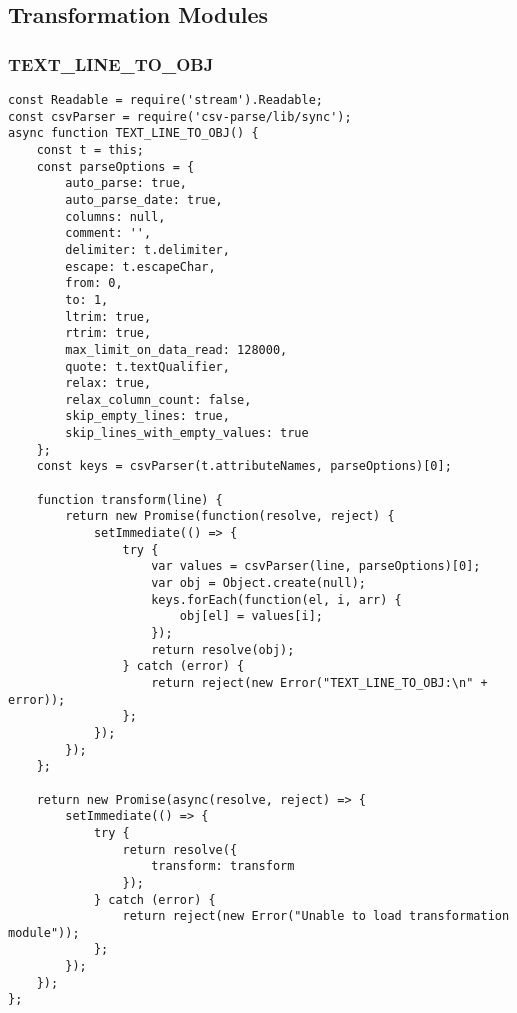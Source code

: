 \subsection{Transformation Modules}
\subsubsection{TEXT\_LINE\_TO\_OBJ}
\label{netl-trans-text-line-to-obj}
\begin{verbatim}
const Readable = require('stream').Readable;
const csvParser = require('csv-parse/lib/sync');
async function TEXT_LINE_TO_OBJ() {
    const t = this;
    const parseOptions = {
        auto_parse: true,
        auto_parse_date: true,
        columns: null,
        comment: '',
        delimiter: t.delimiter,
        escape: t.escapeChar,
        from: 0,
        to: 1,
        ltrim: true,
        rtrim: true,
        max_limit_on_data_read: 128000,
        quote: t.textQualifier,
        relax: true,
        relax_column_count: false,
        skip_empty_lines: true,
        skip_lines_with_empty_values: true
    };
    const keys = csvParser(t.attributeNames, parseOptions)[0];

    function transform(line) {
        return new Promise(function(resolve, reject) {
            setImmediate(() => {
                try {
                    var values = csvParser(line, parseOptions)[0];
                    var obj = Object.create(null);
                    keys.forEach(function(el, i, arr) {
                        obj[el] = values[i];
                    });
                    return resolve(obj);
                } catch (error) {
                    return reject(new Error("TEXT_LINE_TO_OBJ:\n" + error));
                };
            });
        });
    };

    return new Promise(async(resolve, reject) => {
        setImmediate(() => {
            try {
                return resolve({
                    transform: transform
                });
            } catch (error) {
                return reject(new Error("Unable to load transformation module"));
            };
        });
    });
};
\end{verbatim}

